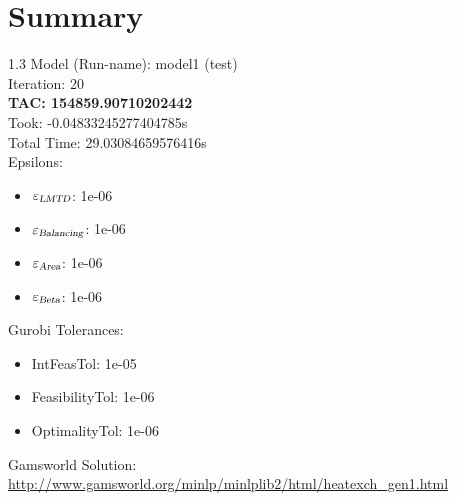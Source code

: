 \documentclass{article}%
\begin{document}
%
\normalsize%
\section{Summary}%
\thispagestyle{plain}%
\begin{spacing}{1.3}%
\Large%
Model (Run-name): model1 (test)\\%
Iteration: 20\\%
\textbf{TAC: 154859.90710202442}\\%
Took: -0.04833245277404785s\\%
Total Time: 29.03084659576416s\\%
Epsilons:%
\begin{itemize}%
	\item $\varepsilon_{\textsl{LMTD}}$: 1e-06%
	\item $\varepsilon_{\textsl{Balancing}}$: 1e-06%
	\item $\varepsilon_{\textsl{Area}}$: 1e-06%
	\item $\varepsilon_{\textsl{Beta}}$: 1e-06%
\end{itemize}%
Gurobi Tolerances:%
\begin{itemize}%
	\item IntFeasTol: 1e-05%
	\item FeasibilityTol: 1e-06%
	\item OptimalityTol: 1e-06%
\end{itemize}%
\end{spacing}%
\normalsize%
Gamsworld Solution: \url{http://www.gamsworld.org/minlp/minlplib2/html/heatexch_gen1.html}%
%
\clearpage%
\end{document}

